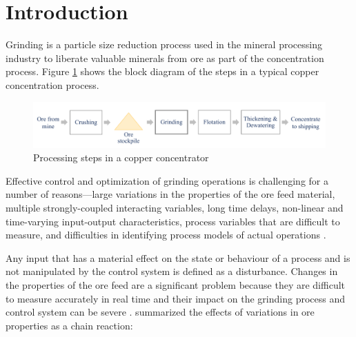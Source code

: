 \chapter*{Introduction}         %
\label{chap-introduction}       %


Grinding is a particle size reduction process used in the mineral processing industry to liberate valuable minerals from ore as part of the concentration process. Figure \ref{fig:process-block-diagram} shows the block diagram of the steps in a typical copper concentration process.

\begin{figure}[htp]
	\centering
	\includegraphics[width=15.5cm]{images/process_block_diagram.pdf}
	\caption{Processing steps in a copper concentrator} \label{fig:process-block-diagram}
\end{figure}


Effective control and optimization of grinding operations is challenging for a number of reasons---large variations in the properties of the ore feed material, multiple strongly-coupled interacting variables, long time delays, non-linear and time-varying input-output characteristics, process variables that are difficult to measure, and difficulties in identifying process models of actual operations \citep{olivier_dual_2012, gough_sag_2015, le_roux_throughput_2016, aguila-camacho_control_2017}. 

Any input that has a material effect on the state or behaviour of a process and is not manipulated by the control system is defined as a disturbance. Changes in the properties of the ore feed are a significant problem because they are difficult to measure accurately in real time and their impact on the grinding process and control system can be severe \citep{herbst_optimal_1988, garrido_multivariable_2009, remes_grinding_2010, liu_development_2018}. \cite{powell_applying_2009} summarized the effects of variations in ore properties as a chain reaction:

